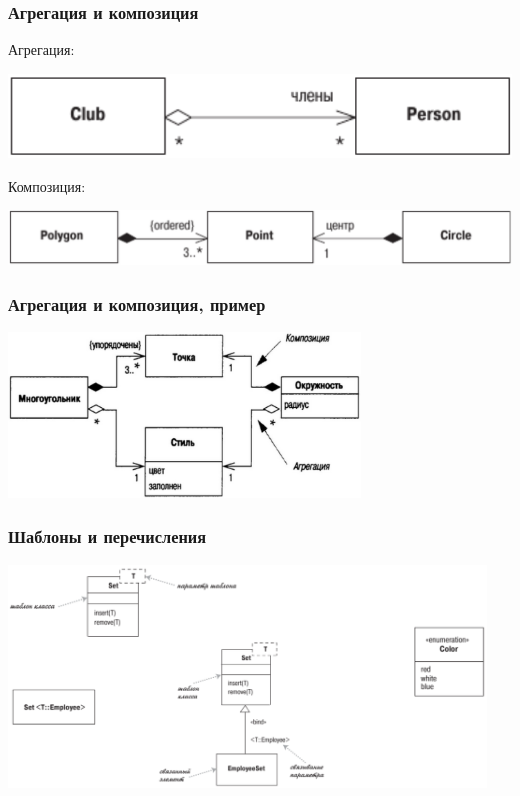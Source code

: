 \documentclass{../../slides-style}
\begin{document}
    \begin{frame}
        \frametitle{Агрегация и композиция}
        Агрегация:
        \begin{center}
            \includegraphics[height=0.1\textheight]{aggregation.png}
        \end{center}
        \vspace{5mm}
        Композиция:
        \begin{center}
            \includegraphics[height=0.1\textheight]{composition.png}
        \end{center}
    \end{frame}

    \begin{frame}
        \frametitle{Агрегация и композиция, пример}
        \begin{center}
            \includegraphics[width=0.7\textwidth]{aggregationAndCompositionExample.png}
        \end{center}
    \end{frame}

    \begin{frame}
        \frametitle{Шаблоны и перечисления}
        \begin{center}
            \includegraphics[width=0.95\textwidth]{genericsAndEnums.png}
        \end{center}
    \end{frame}
\end{document}
